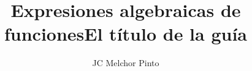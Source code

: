 \documentclass[12pt,addpoints,answers]{guia}
\title{Expresiones algebraicas de funciones}
\title{El título de la guía}
\author{JC Melchor Pinto}
\begin{document}
\pagestyle{headandfoot}
\INFO
\vspace{-0.5cm}
\begin{multicols}{2}
    
    \columnbreak
    
    
    
\end{multicols}

\begin{questions}
    \questionboxed[20]{}
    \questionboxed[20]{}
    \questionboxed[20]{}
    \questionboxed[20]{}
    \questionboxed[20]{}
\end{questions}
\end{document}
